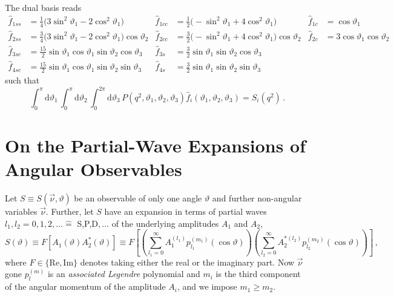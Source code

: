 \documentclass[aps,prd,reprint,nofootinbib,preprintnumbers]{revtex4}
\newcommand{\rmdx}[1]{\mbox{d} #1 \,} %
\newcommand{\nuvec}{\vec{\nu}}
\renewcommand{\theta}{\vartheta}
\newcommand{\fred}[1]{{\color{brown!85!black}#1}}
\begin{document}
The dual basis reads
\begin{equation}
    \begin{aligned}
        \hat f_{1ss} & = \frac{1}{4}\big(3 \sin^2\theta_1 - 2 \cos^2\theta_1\big) &
        \hat f_{1cc} & = \frac{1}{2}\big(- \sin^2\theta_1 + 4 \cos^2\theta_1\big) &
        \hat f_{1c}  & = \cos\theta_1\\
        \hat f_{2ss} & = \frac{3}{4}\big(3 \sin^2\theta_1 - 2 \cos^2\theta_1\big) \cos\theta_2 &
        \hat f_{2cc} & = \frac{3}{2}\big(- \sin^2\theta_1 + 4 \cos^2\theta_1\big) \cos\theta_2 &
        \hat f_{2c}  & = 3 \cos\theta_1   \cos\theta_2 \\
        \hat f_{3sc} & = \frac{15}{2}\sin\theta_1 \cos\theta_1 \sin\theta_2 \cos\theta_3 &
        \hat f_{3s}  & = \frac{3}{2} \sin\theta_1              \sin\theta_2 \cos\theta_3 \\
        \hat f_{4sc} & = \frac{15}{2}\sin\theta_1 \cos\theta_1 \sin\theta_2 \sin\theta_3 &
        \hat f_{4s}  & = \frac{3}{2} \sin\theta_1              \sin\theta_2 \sin\theta_3
    \end{aligned}
\end{equation}
such that
\begin{equation}
    \int_0^\pi \rmdx{\theta_1} \int_0^\pi \rmdx{\theta_2} \int_0^{2\pi} \rmdx{\theta_3} P(q^2, \theta_1, \theta_2, \theta_3) \hat{f}_i(\theta_1, \theta_2, \theta_3) = S_i(q^2)\,.
\end{equation}


\section{On the Partial-Wave Expansions of Angular Observables}
\label{app:partial-waves}

Let $S \equiv S(\vec{\nu},\theta)$ be an observable of only one angle $\theta$ and further non-angular variables $\vec{\nu}$. Further, let
$S$ have an expansion in terms of partial waves $l_1, l_2 = 0,1,2,\dots \hat{=}$ S,P,D$,\dots$ of the underlying amplitudes $A_1$ and $A_2$,
\begin{equation}
    \label{eq:def-partial-wave-observable}
    S(\theta) \equiv F\left[A_1(\theta) A_2^*(\theta)\right] \equiv F\left[\left(\sum_{l_1=0}^\infty A_1^{(l_1)} p_{l_1}^{(m_1)}(\cos\theta)\right) \left(\sum_{l_2=0}^\infty A_2^{*(l_2)} p_{l_2}^{(m_2)}(\cos\theta)\right)\right]\,,
\end{equation}
where $F \in \{\text{Re},\text{Im}\}$ denotes taking either the real
or the imaginary part. \fred{Now $\nuvec$ gone}
$p_{l}^{(m)}$ is an \emph{associated Legendre} polynomial and $m_i$ is the third component of the angular momentum of the amplitude $A_i$, and we impose $m_1 \geq m_2$.\\
\end{document}
